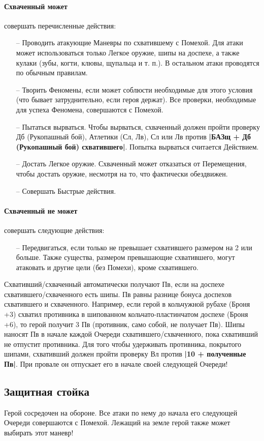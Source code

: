 \paragraph{Схваченный может} совершать перечисленные действия:
\begin{itemize}
\item[--] Проводить атакующие Маневры по схватившему с Помехой. Для атаки может использоваться только Легкое оружие, шипы на доспехе, а также кулаки (зубы, когти, клювы, щупальца и т. п.). В остальном атаки проводятся по обычным правилам.
\item[--] Творить Феномены, если может соблюсти необходимые для этого условия (что бывает затруднительно, если героя держат). Все проверки, необходимые для успеха Феномена, совершаются с Помехой.
\item[--] Пытаться вырваться. Чтобы вырваться, схваченный должен пройти проверку Дб (Рукопашный бой), Атлетики (Сл, Лв), Сл или Лв против \textbf{|БАЗщ + Дб (Рукопашный бой) схватившего|}. Попытка вырваться считается Действием.
\item[--] Достать Легкое оружие. Схваченный может отказаться от Перемещения, чтобы достать оружие, несмотря на то, что фактически обездвижен.
\item[--] Совершать Быстрые действия.
\end{itemize}
\paragraph{Схваченный не может} совершать следующие действия:
\begin{itemize}
\item[--] Передвигаться, если только не превышает схватившего размером на 2 или больше. Также существа, размером превышающие схватившего, могут атаковать и другие цели (без Помехи), кроме схватившего. 
\end{itemize}
Схвативший/схваченный автоматически получают Пв, если на доспехе схватившего/схваченного есть шипы. Пв равны разнице бонуса доспехов схватившего и схваченного. Например, если герой в кольчужной рубахе (Броня +3) схватил противника в шипованном кольчато-пластинчатом доспехе (Броня +6), то герой получит 3 Пв (противник, само собой, не получает Пв). Шипы наносят Пв в начале каждой Очереди схватившего/схваченного, пока схвативший не отпустит противника. Для того чтобы удерживать противника, покрытого шипами, схвативший должен пройти проверку Вл против \textbf{|10 + полученные Пв|}. При провале он отпускает его в начале своей следующей Очереди!
\subsection{Защитная стойка}
Герой сосредочен на обороне. Все атаки по нему до начала его следующей Очереди совершаются с Помехой. Лежащий на земле герой также может выбирать этот маневр!
